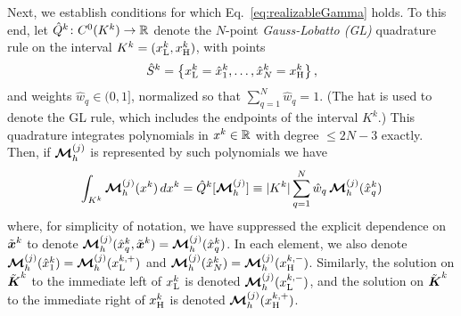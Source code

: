 Next, we establish conditions for which Eq.~\eqref{eq:realizableGamma} holds.  
To this end, let $\hat{Q}^{k}\colon C^{0}(K^{k})\to\mathbb{R}$ denote the $N$-point \emph{Gauss-Lobatto (GL)} quadrature rule on the interval $K^{k}=(x_{{\rm L}}^{k},x_{{\rm H}}^{k})$, with points
\begin{equation}
  \hat{S}^{k}=\left\{x_{{\rm L}}^{k}=\hat{x}_{1}^{k},\ldots,\hat{x}_{N}^{k}=x_{{\rm H}}^{k}\right\}, 
  \label{eq:quadraturePointsGL}
\end{equation}
and weights $\hat{w}_{q} \in (0,1]$, normalized so that $\sum_{q=1}^{N} \hat{w}_{q} = 1$.  
(The hat is used to denote the GL rule, which includes the endpoints of the interval $K^{k}$.)
This quadrature integrates polynomials in $x^{k} \in \mathbb{R}$ with degree $\le2N-3$ exactly.  
Then, if $\boldsymbol{\mathcal{M}}_{h}^{(j)}$ is represented by such polynomials we have
\begin{equation}
  \int_{K^{k}} \boldsymbol{\mathcal{M}}_{h}^{(j)}(x^{k})\,dx^{k} = \hat{Q}^{k}[\boldsymbol{\mathcal{M}}_{h}^{(j)}] \equiv
  |K^{k}| \sum_{q=1}^{N} \hat{w}_{q}\,\boldsymbol{\mathcal{M}}_{h}^{(j)}(\hat{x}_{q}^{k})
  \label{eq:quadratureRuleGL}
\end{equation}
where, for simplicity of notation, we have suppressed the explicit dependence on $\tilde{\boldsymbol{x}}^{k}$ to denote $\boldsymbol{\mathcal{M}}_{h}^{(j)}(\hat{x}_q^{k},\tilde{\boldsymbol{x}}^{k}) = \boldsymbol{\mathcal{M}}_{h}^{(j)}(\hat{x}_{q}^{k})$.  
In each element, we also denote $\boldsymbol{\mathcal{M}}_{h}^{(j)}(\hat{x}_{1}^{k})=\boldsymbol{\mathcal{M}}_{h}^{(j)}(x_{{\rm L}}^{k,+})$ and $\boldsymbol{\mathcal{M}}_{h}^{(j)}(\hat{x}_{N}^{k})=\boldsymbol{\mathcal{M}}_{h}^{(j)}(x_{{\rm H}}^{k,-})$.  
Similarly, the solution on $\tilde{\boldsymbol{\boldsymbol{K}}}^{k}$ to the immediate left of $x_{{\rm L}}^{k}$ is denoted $\boldsymbol{\mathcal{M}}_{h}^{(j)}(x_{{\rm L}}^{k,-})$, and the solution on $\tilde{\boldsymbol{\boldsymbol{K}}}^{k}$ to the immediate right of $x_{{\rm H}}^{k}$ is denoted $\boldsymbol{\mathcal{M}}_{h}^{(j)}(x_{{\rm H}}^{k,+})$.  

